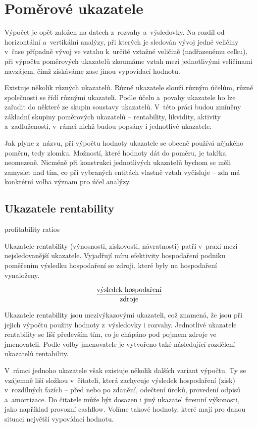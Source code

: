\section{Poměrové ukazatele}
Výpočet je opět založen na datech z~rozvahy a~výsledovky. Na rozdíl od horizontální a~vertikální analýzy, při kterých je sledován vývoj jedné veličiny v~čase případně vývoj ve vztahu k~určité vztažné veličině (nadřazenému celku), při výpočtu poměrových ukazatelů zkoumáme vztah mezi jednotlivými veličinami navzájem, čímž získáváme zase jinou vypovídací hodnotu.

Existuje několik různých ukazatelů. Různé ukazatele slouží různým účelům, různé společnosti se řídí různými ukazateli. Podle účelu a~povahy ukazatele ho lze zařadit do některé ze skupin soustavy ukazatelů. V~této práci budou zmíněny základní skupiny poměrových ukazatelů -- rentability, likvidity, aktivity a~zadluženosti, v~rámci nichž budou popsány i jednotlivé ukazatele.

Jak plyne z~názvu, při výpočtu hodnoty ukazatele se obecně používá nějakého poměru, tedy zlomku. Možností, které hodnoty dát do poměru, je takřka neomezeně. Nicméně při konstrukci jednotlivých ukazatelů bychom se měli zamyslet nad tím, co při vybraných entitách vlastně vztah vyčísluje -- zda má konkrétní volba význam pro účel analýzy\cite{kisling}.

\pagebreak
\subsection{Ukazatele rentability}
profitability ratios

Ukazatele rentability (výnosnosti, ziskovosti, návratnosti) patří v~praxi mezi nejsledovanější ukazatele. Vyjadřují míru efektivity hospodaření podniku poměřením výsledku hospodaření se zdroji, které byly na hospodaření vynaloženy.

$$\dfrac{\text{výsledek hospodaření}}{\text{zdroje}}$$

Ukazatele rentability jsou mezivýkazovými ukazateli, což znamená, že jsou při jejich výpočtu použity hodnoty z~výsledovky i rozvahy. Jednotlivé ukazatele rentability se liší především tím, co je chápáno pod pojmem zdroje ve jmenovateli\cite{mendelu}. Podle volby jmenovatele je vytvořeno také následující rozdělení ukazatelů rentability. 

V~rámci jednoho ukazatele však existuje několik dalších variant výpočtu. Ty se vzájemně liší složkou v~čitateli, která zachycuje výsledek hospodaření (zisk) v~rozdílných fazích -- před nebo po zdanění, odečtení úroků, provedení odpisů a~amortizace. Do čitatele může být dosazen i jiný ukazatel firemní výkonosti, jako například provozní cashflow. Volíme takové hodnoty, které mají pro danou situaci největší vypovídací hodnotu.

